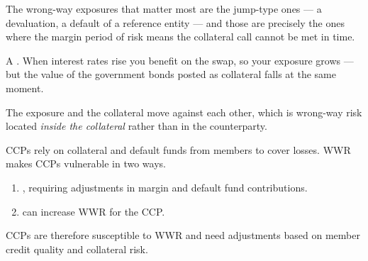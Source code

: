 \begin{crtrapbox}
The wrong-way exposures that matter most are the jump-type ones --- a
devaluation, a default of a reference entity --- and those are precisely the ones
where the margin period of risk means the collateral call cannot be met in time.
\end{crtrapbox}


\begin{crkeybox}
A . When
interest rates rise you benefit on the swap, so your exposure grows --- but the
value of the government bonds posted as collateral falls at the same moment.

\smallskip
The exposure and the collateral move against each other, which is wrong-way risk
located \emph{inside the collateral} rather than in the counterparty.
\end{crkeybox}


CCPs rely on collateral and default funds from members to cover losses. WWR makes
CCPs vulnerable in two ways.

\begin{enumerate}[label=\alph*)]
\item {}, requiring
adjustments in margin and default fund contributions.
\item {} can increase WWR for the CCP.
\end{enumerate}

CCPs are therefore susceptible to WWR and need adjustments based on member credit
quality and collateral risk.


